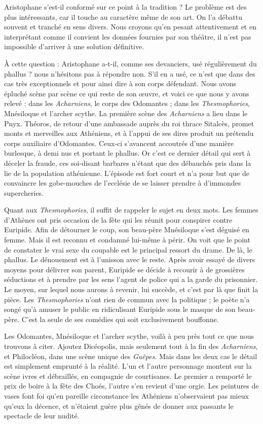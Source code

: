 \documentclass{book}%
\newcommand{\italique}[1]{\textit{#1}}%
\begin{document}
Aristophane s'est-il conformé sur ce point à la tradition ? Le problème est des plus intéressants, car il touche au caractère même de son art. On l'a débattu souvent et tranché en sens divers. Nous croyons qu'en pesant attentivement et en interprétant comme il convient les données fournies par son théâtre, il n'est pas impossible d'arriver à une solution définitive.

À cette question : Aristophane a-t-il, comme ses devanciers, usé régulièrement du phallus ? nous n'hésitons pas à répondre non. S'il en a usé, ce n'est que dans des cas très exceptionnels et pour ainsi dire à son corps défendant. Nous avons épluché scène par scène ce qui reste de son œuvre, et voici ce que nous y avons relevé : dans les \italique{Acharniens}, le corps des Odomantes ; dans les \italique{Thesmophories}, Mnésiloque et l'archer scythe. La première scène des \italique{Acharniens} a lieu dans le Pnyx. Théoros, de retour d'une ambassade auprès du roi thrace Sitalcès, promet monts et merveilles aux Athéniens, et à l'appui de ses dires produit un prétendu corps auxiliaire d'Odomantes. Ceux-ci s'avancent accoutrés d'une manière burlesque, à demi nus et portant le phallus. Or c'est ce dernier détail qui sert à déceler la fraude, ces soi-disant barbares n'étant que des débauchés pris dans la lie de la population athénienne. L'épisode est fort court et n'a pour but que de convaincre les gobe-mouches de l'ecclésie de se laisser prendre à d'immondes supercheries. 

Quant aux \italique{Thesmophories}, il suffit de rappeler le sujet en deux mots. Les femmes d'Athènes ont pris occasion de la fête qui les réunit pour conspirer contre Euripide. Afin de détourner le coup, son beau-père Mnésiloque s'est déguisé en femme. Mais il est reconnu et condamné lui-même à périr. On voit que le point de constater le vrai sexe du coupable est le principal ressort du drame. De là, le phallus. Le dénouement est à l'unisson avec le reste. Après avoir essayé de divers moyens pour délivrer son parent, Euripide se décide à recourir à de grossières séductions et à prendre par les sens l'agent de police qui a la garde du prisonnier. Le moyen, sur lequel nous aurons à revenir, lui succède, et c'est par là que finit la pièce. Les \italique{Thesmophories} n'ont rien de commun avec la politique ; le poète n'a songé qu'à amuser le public en ridiculisant Euripide sous le masque de son beau-père. C'est la seule de ses comédies qui soit exclusivement bouffonne.

Les Odomantes, Mnésiloque et l'archer scythe, voilà à peu près tout ce que nous trouvons à citer. Ajoutez Dicéopolis, mais seulement tout à la fin des \italique{Acharniens}, et Philocléon, dans une scène unique des \italique{Guêpes}. Mais dans les deux cas le détail est simplement emprunté à la réalité. L'un et l'autre personnage montent sur la scène ivres et débraillés, en compagnie de courtisanes. Le premier a remporté le prix de boire à la fête des Choés, l'autre s'en revient d'une orgie. Les peintures de vases font foi qu'en pareille circonstance les Athéniens n'observaient pas mieux qu'eux la décence, et n'étaient guère plus gênés de donner aux passants le spectacle de leur nudité. 
\end{document}
